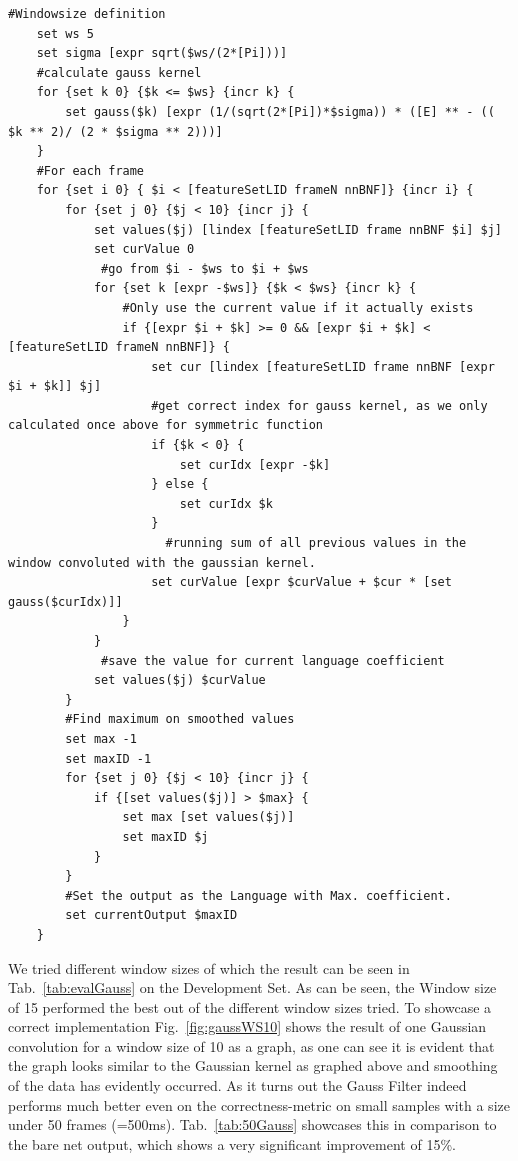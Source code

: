 \begin{lstlisting}[label=lst:tclGauss,caption=Gaussian Smoothing Filter as implemented in tcl/tk for the jrtk]
    #Windowsize definition
    set ws 5
    set sigma [expr sqrt($ws/(2*[Pi]))]
    #calculate gauss kernel
    for {set k 0} {$k <= $ws} {incr k} {
        set gauss($k) [expr (1/(sqrt(2*[Pi])*$sigma)) * ([E] ** - (( $k ** 2)/ (2 * $sigma ** 2)))]
    }
    #For each frame
    for {set i 0} { $i < [featureSetLID frameN nnBNF]} {incr i} {
        for {set j 0} {$j < 10} {incr j} {
            set values($j) [lindex [featureSetLID frame nnBNF $i] $j]
            set curValue 0
	         #go from $i - $ws to $i + $ws
            for {set k [expr -$ws]} {$k < $ws} {incr k} {
                #Only use the current value if it actually exists
                if {[expr $i + $k] >= 0 && [expr $i + $k] < [featureSetLID frameN nnBNF]} {
                    set cur [lindex [featureSetLID frame nnBNF [expr $i + $k]] $j]
                    #get correct index for gauss kernel, as we only calculated once above for symmetric function
                    if {$k < 0} {
                        set curIdx [expr -$k]
                    } else {
                        set curIdx $k
                    }
		              #running sum of all previous values in the window convoluted with the gaussian kernel.
                    set curValue [expr $curValue + $cur * [set gauss($curIdx)]]
                }
            }
	         #save the value for current language coefficient
            set values($j) $curValue
        }
        #Find maximum on smoothed values
        set max -1
        set maxID -1
        for {set j 0} {$j < 10} {incr j} {
            if {[set values($j)] > $max} {
                set max [set values($j)]
                set maxID $j
            }
        }
        #Set the output as the Language with Max. coefficient.
        set currentOutput $maxID
    }
\end{lstlisting}


We tried different window sizes of which the result can be seen in Tab.~\ref{tab:evalGauss} on the Development Set.  As can be seen, the Window size of 15 performed the best out of the different window sizes tried. To showcase a correct implementation Fig.~\ref{fig:gaussWS10} shows the result of one Gaussian convolution for a window size of 10 as a graph, as one can see it is evident that the graph looks similar to the Gaussian kernel as graphed above and smoothing of the data has evidently occurred.  As it turns out the Gauss Filter indeed performs much better even on the correctness-metric on small samples with a size under 50 frames (=500ms). Tab.~\ref{tab:50Gauss} showcases this in comparison to the bare net output, which shows a very significant improvement of 15\%.

